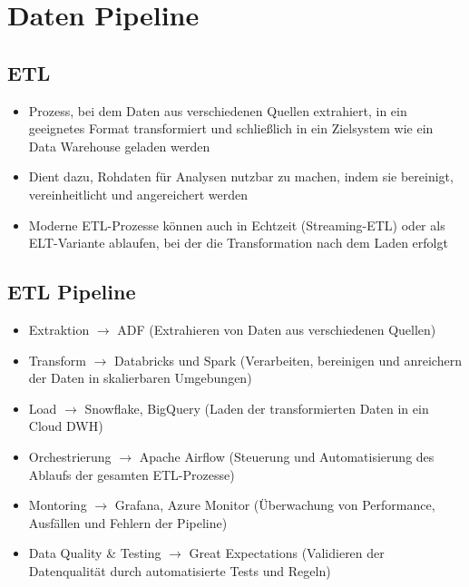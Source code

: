 \documentclass[11pt]{scrartcl}
\begin{document}
\section{Daten Pipeline}
\subsection{ETL}
\begin{itemize}
	\item Prozess, bei dem Daten aus verschiedenen Quellen extrahiert, in ein geeignetes Format transformiert und schließlich in ein Zielsystem wie ein Data Warehouse geladen werden
	\item Dient dazu, Rohdaten für Analysen nutzbar zu machen, indem sie bereinigt, vereinheitlicht und angereichert werden
	\item Moderne ETL-Prozesse können auch in Echtzeit (Streaming-ETL) oder als ELT-Variante ablaufen, bei der die Transformation nach dem Laden erfolgt
\end{itemize}


\subsection{ETL Pipeline}
\begin{itemize}
	\item Extraktion $ \to $ ADF (Extrahieren von Daten aus verschiedenen Quellen)
	\item Transform $ \to $ Databricks und Spark (Verarbeiten, bereinigen und anreichern der Daten in skalierbaren Umgebungen)
	\item Load $ \to $ Snowflake, BigQuery (Laden der transformierten Daten in ein Cloud DWH)
	\item Orchestrierung $ \to $ Apache Airflow (Steuerung und Automatisierung des Ablaufs der gesamten ETL-Prozesse)
	\item Montoring $ \to $ Grafana, Azure Monitor (Überwachung von Performance, Ausfällen und Fehlern der Pipeline)
	\item Data Quality \& Testing $ \to $ Great Expectations (Validieren der Datenqualität durch automatisierte Tests und Regeln)
\end{itemize}
\end{document}

